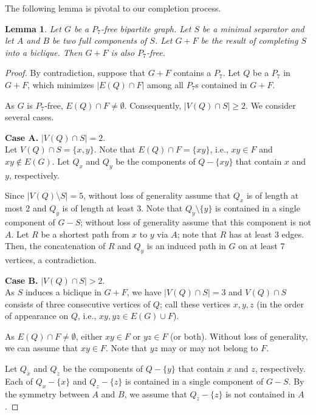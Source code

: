 \documentclass[11pt,a4paper]{article}
\newtheorem{lemma}[theorem]{Lemma}
\theoremstyle{definition}
\begin{document}
The following lemma is pivotal to our completion process.
\begin{lemma}\label{lem:no_new_path}
Let $G$ be a $P_7$-free bipartite graph. Let $S$ be a minimal separator and let $A$ and $B$ be two full components of $S$. Let $G+F$ be the result of completing $S$ into a biclique.
Then $G+F$ is also $P_7$-free.
\end{lemma}
\begin{proof}
    By contradiction, suppose that $G+F$ contains a $P_7$. Let $Q$ be a $P_7$ in $G + F$, which minimizes $|E(Q)\cap F|$ among all $P_7$s contained in $G+F$. 
    
    As $G$ is $P_7$-free, $E(Q) \cap F \neq \emptyset$. Consequently,
    $|V(Q) \cap S| \geq 2$.
    We consider several cases.

    \medskip

    \noindent\textbf{Case A.} 
    $|V(Q)\cap S|=2$.\\ 
    Let $V(Q) \cap S = \{x,y\}$. Note that $E(Q) \cap F = \{xy\}$, i.e., $xy \in F$
    and $xy \notin E(G)$.
    Let $Q_x$ and $Q_y$ be the components of $Q-\{xy\}$ that contain $x$ and $y$, respectively.
    
    Since $|V(Q) \setminus S| = 5$, without loss of generality assume that $Q_x$ is of length at most $2$ and $Q_y$ is of length at least $3$.
    Note that $Q_y \setminus \{y\}$ is contained in a single component of $G-S$; without loss
    of generality assume that this component is not $A$. 
    Let $R$ be a shortest path from $x$ to $y$ via $A$; note that $R$ 
    has at least $3$ edges.
    Then, the concatenation of $R$ and $Q_y$ is an induced path in $G$ on at least $7$ vertices, a contradiction.

    \medskip

    \noindent \textbf{Case B.} $|V(Q)\cap S| >2$.\\ As $S$ induces a biclique in $G+F$, we have $|V(Q)\cap S|=3$ and $V(Q) \cap S$ consists of three consecutive vertices of $Q$;
    call these vertices $x,y,z$ (in the order of appearance on $Q$, i.e., $xy,yz \in E(G) \cup F$). 
    
    As $E(Q) \cap F \neq \emptyset$, either $xy \in F$ or $yz \in F$ (or both).
    Without loss of generality, we can assume that $xy\in F$. Note that $yz$ may or may not belong to $F$.

    Let $Q_x$ and $Q_z$ be the components of $Q-\{y\}$ that contain $x$ and $z$, respectively.
    Each of $Q_x-\{x\}$ and $Q_z-\{z\}$ is contained in a single component of $G-S$.
    By the symmetry between $A$ and $B$, we assume that $Q_z-\{z\}$ is not contained
    in $A$.
    

\end{proof}
\end{document}
